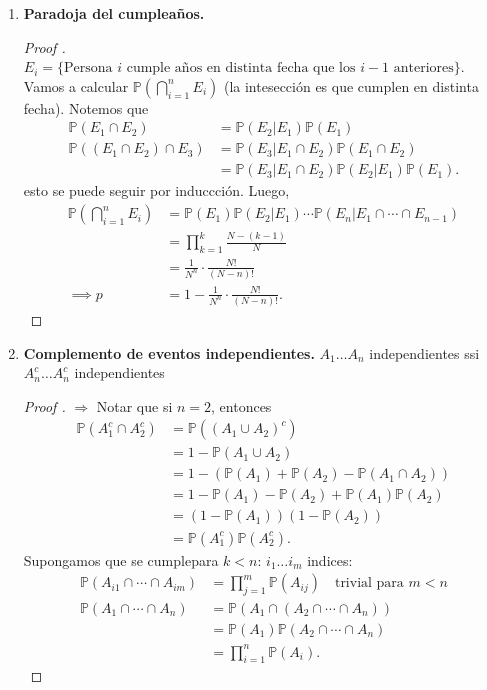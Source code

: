\documentclass[a4paper]{report}
\begin{document}
\begin{enumerate}
	\item \textbf{Paradoja del cumpleaños.}
	\begin{proof}[Proof ]
		$E_i = \{ \text{Persona } i \text{ cumple años en distinta fecha que los } i-1 \text{ anteriores} \} $. Vamos a calcular $\mathbb{P}\left( \bigcap_{i=1}^{n} E_i \right)$ (la intesección es que cumplen en distinta fecha). Notemos que
		\begin{align*}
			\mathbb{P}(E_1\cap E_2) & = \mathbb{P}(E_2|E_1)\mathbb{P}(E_1) \\
			\mathbb{P}((E_1\cap E_2)\cap E_3) & = \mathbb{P}(E_3|E_1\cap E_2) \mathbb{P}(E_1\cap E_2) \\
			& = \mathbb{P}(E_3|E_1\cap E_2) \mathbb{P}(E_2|E_1) \mathbb{P}(E_1)
		.\end{align*}
		esto se puede seguir por induccción. Luego,
		\begin{align*}
			\mathbb{P}\left(\bigcap_{i=1}^{n} E_i \right) & = \mathbb{P}(E_1)\mathbb{P}(E_2|E_1)\cdots \mathbb{P}(E_n|E_1 \cap \cdots \cap E_{n-1}) \\
			& = \prod_{k=1}^{k} \frac{N-(k-1)}{N} \\
			& = \frac{1}{N^n}\cdot \frac{N!}{(N-n)!} \\
			\implies p & = 1- \frac{1}{N^n}\cdot \frac{N!}{(N-n)!}
		.\end{align*}
	\end{proof}

	\item \textbf{Complemento de eventos independientes.} $A_1\dots A_n$ independientes ssi $A_n^c \dots A_n^c$ independientes
	\begin{proof}[Proof ]
		$\Rightarrow$ Notar que si $n=2$, entonces
		\begin{align*}
			\mathbb{P}(A_1^c \cap A_2^c) & = \mathbb{P}((A_1\cup A_2)^c) \\
			& = 1 - \mathbb{P}(A_1 \cup A_2) \\
			&= 1 - (\mathbb{P}(A_1) + \mathbb{P}(A_{2}) - \mathbb{P}(A_{1}\cap A_{2})) \\
			&= 1 - \mathbb{P}(A_{1}) - \mathbb{P}(A_{2}) + \mathbb{P}(A_{1})\mathbb{P}(A_{2}) \\
			&= (1-\mathbb{P}(A_{1}))(1 - \mathbb{P}(A_{2})) \\
			&= \mathbb{P}(A_1^c)\mathbb{P}(A_2^c)
		.\end{align*}
		Supongamos que se cumplepara $k<n$: $i_1\dots i_m$ indices:
		\begin{align*}
			\mathbb{P}(A_{i1}\cap \cdots \cap A_{im}) & = \prod_{j=1}^{m} \mathbb{P}(A_{ij}) \quad \text{trivial para } m<n \\
			\mathbb{P}(A_{1}\cap\cdots\cap A_{n}) &= \mathbb{P}(A_{1}\cap (A_{2}\cap\cdots\cap A_n)) \\
			&= \mathbb{P} (A_1)\mathbb{P}(A_{2}\cap\cdots\cap A_n) \\
			&= \prod_{i=1}^{n} \mathbb{P}(A_i)
		.\end{align*}
	\end{proof}
\end{enumerate}
\end{document}
